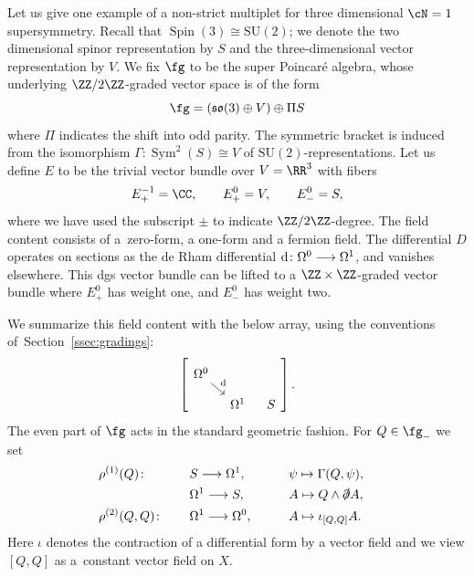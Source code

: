 \documentclass[10pt,a4paper]{amsart}
\numberwithin{equation}{section}
\def\lie#1{\ensuremath{\mathfrak{#1}}}
\def\so{\lie{so}}
\def\d{{\rm d}}
\DeclareMathOperator{\Spin}{Spin}
\DeclareMathOperator{\Sym}{Sym}
\begin{document}
\begin{eg}
	Let us give one example of a non-strict multiplet for three dimensional $\cN=1$ supersymmetry. Recall that $\Spin(3) \cong \mathrm{SU}(2)$; we denote the two dimensional spinor representation by $S$ and the three-dimensional vector representation by $V$. We fix $\fg$ to be the super Poincar\'e algebra, whose underlying $\ZZ/2\ZZ$-graded vector space is of the form
	\begin{equation*}
	\fg = (\so(3) \oplus V) \oplus \Pi S
	\end{equation*}
	where $\Pi$ indicates the shift into odd parity. The symmetric bracket is induced from the isomorphism $\Gamma \colon\Sym^2(S) \cong V$ of $\mathrm{SU}(2)$-representations. Let us define $E$ to be the trivial vector bundle over $V = \RR^3$ with fibers
	\begin{equation*}
	E^{-1}_+ = \CC, \qquad E^0_+ = V, \qquad E^0_- = S ,
	\end{equation*}
	where we have used the subscript $\pm$ to indicate $\ZZ/2\ZZ$-degree. The field content consists of a~zero-form, a one-form and a fermion field. The differential $D$ operates on sections as the de Rham differential $\d\colon \Omega^0 \longrightarrow \Omega^1$, and vanishes elsewhere. This dgs vector bundle can be lifted to a $\ZZ \times \ZZ$-graded vector bundle where $E^0_+$ has weight one, and $E^0_-$ has weight two.
	
	We summarize this field content with the below array, using the conventions of~Section~\ref{ssec:gradings}:
	\begin{equation*}
	\left[
	\begin{tikzcd}[column sep = 0.3cm , row sep = 0.3cm]
	\Omega^0 \arrow[dr ,"\d"] & & \\
	& \Omega^1 & S
	\end{tikzcd} \right].
	\end{equation*}
	The even part of $\fg$ acts in the standard geometric fashion. For $Q\in \fg_-$ we set
	\begin{alignat*}{4}
	&\rho^{(1)}(Q) \colon \quad&& S \longrightarrow \Omega^1 ,\qquad&& \psi \mapsto \Gamma(Q,\psi),& \\
	&&& \Omega^1 \longrightarrow S ,\qquad&& A \mapsto Q \wedge \slashed{\partial} A,& \\
	&\rho^{(2)}(Q,Q) \colon\quad&& \Omega^1 \longrightarrow \Omega^0 ,\qquad&& A \mapsto \iota_{[Q, Q ]} A.&
	\end{alignat*}
	Here $\iota$ denotes the contraction of a differential form by a vector field and we view $[Q,Q]$ as a~constant vector field on $X$.
\end{eg}
\end{document}

